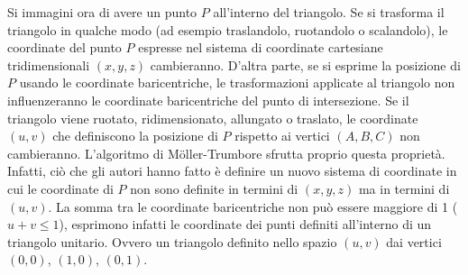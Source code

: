 Si immagini ora di avere un punto $P$ all'interno del triangolo. Se si trasforma il triangolo in qualche modo (ad esempio traslandolo, ruotandolo o scalandolo), le coordinate del punto $P$ espresse nel sistema di coordinate cartesiane tridimensionali $(x,y,z)$ cambieranno. D'altra parte, se si esprime la posizione di $P$ usando le coordinate baricentriche, le trasformazioni applicate al triangolo non influenzeranno le coordinate baricentriche del punto di intersezione. Se il triangolo viene ruotato, ridimensionato, allungato o traslato, le coordinate $(u,v)$ che definiscono la posizione di $P$ rispetto ai vertici $(A,B,C)$ non cambieranno. L'algoritmo di M\"oller-Trumbore sfrutta proprio questa proprietà. Infatti, ciò che gli autori hanno fatto è definire un nuovo sistema di coordinate in cui le coordinate di $P$ non sono definite in termini di $(x,y,z)$ ma in termini di $(u,v)$. La somma tra le coordinate baricentriche non può essere maggiore di 1 ($u + v \leq 1$), esprimono infatti le coordinate dei punti definiti all'interno di un triangolo unitario. Ovvero un triangolo definito nello spazio $(u,v)$ dai vertici $(0,0)$, $(1,0)$, $(0,1)$.


